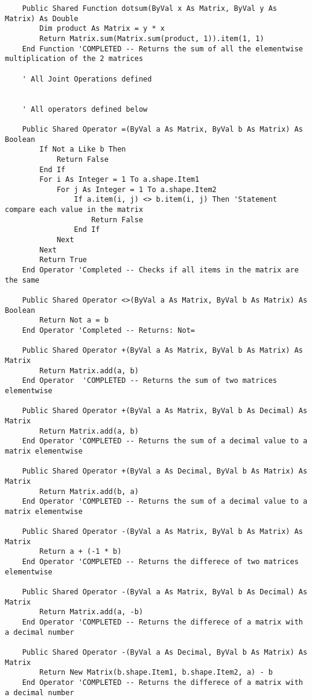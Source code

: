 \begin{verbatim}
    Public Shared Function dotsum(ByVal x As Matrix, ByVal y As Matrix) As Double
        Dim product As Matrix = y * x
        Return Matrix.sum(Matrix.sum(product, 1)).item(1, 1)
    End Function 'COMPLETED -- Returns the sum of all the elementwise multiplication of the 2 matrices

    ' All Joint Operations defined


    ' All operators defined below

    Public Shared Operator =(ByVal a As Matrix, ByVal b As Matrix) As Boolean
        If Not a Like b Then
            Return False
        End If
        For i As Integer = 1 To a.shape.Item1
            For j As Integer = 1 To a.shape.Item2
                If a.item(i, j) <> b.item(i, j) Then 'Statement compare each value in the matrix
                    Return False
                End If
            Next
        Next
        Return True
    End Operator 'Completed -- Checks if all items in the matrix are the same

    Public Shared Operator <>(ByVal a As Matrix, ByVal b As Matrix) As Boolean
        Return Not a = b
    End Operator 'Completed -- Returns: Not=

    Public Shared Operator +(ByVal a As Matrix, ByVal b As Matrix) As Matrix
        Return Matrix.add(a, b)
    End Operator  'COMPLETED -- Returns the sum of two matrices elementwise

    Public Shared Operator +(ByVal a As Matrix, ByVal b As Decimal) As Matrix
        Return Matrix.add(a, b)
    End Operator 'COMPLETED -- Returns the sum of a decimal value to a matrix elementwise

    Public Shared Operator +(ByVal a As Decimal, ByVal b As Matrix) As Matrix
        Return Matrix.add(b, a)
    End Operator 'COMPLETED -- Returns the sum of a decimal value to a matrix elementwise

    Public Shared Operator -(ByVal a As Matrix, ByVal b As Matrix) As Matrix
        Return a + (-1 * b)
    End Operator 'COMPLETED -- Returns the differece of two matrices elementwise

    Public Shared Operator -(ByVal a As Matrix, ByVal b As Decimal) As Matrix
        Return Matrix.add(a, -b)
    End Operator 'COMPLETED -- Returns the differece of a matrix with a decimal number

    Public Shared Operator -(ByVal a As Decimal, ByVal b As Matrix) As Matrix
        Return New Matrix(b.shape.Item1, b.shape.Item2, a) - b
    End Operator 'COMPLETED -- Returns the differece of a matrix with a decimal number


\end{verbatim}
